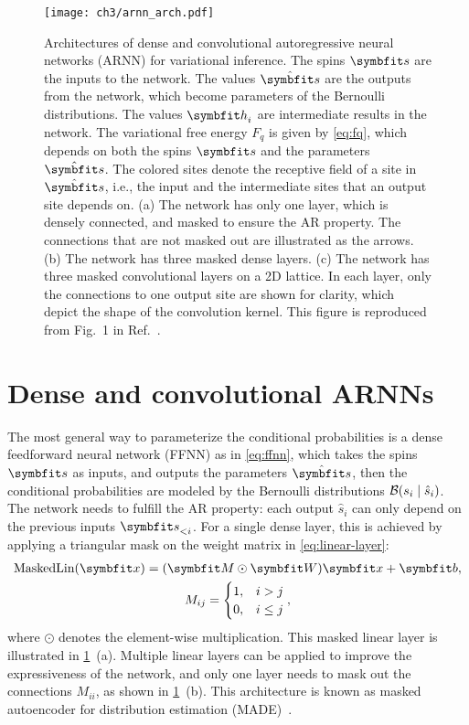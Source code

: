 \begin{figure}[htb]
\centering
\texttt{[image: ch3/arnn\_arch.pdf]}
\caption[Architectures of autoregressive neural networks (ARNN)]{
Architectures of dense and convolutional autoregressive neural networks (ARNN) for variational inference.
The spins $\vs$ are the inputs to the network.
The values $\hat{\vs}$ are the outputs from the network, which become parameters of the Bernoulli distributions.
The values $\vh_i$ are intermediate results in the network.
The variational free energy $F_q$ is given by \cref{eq:fq}, which depends on both the spins $\vs$ and the parameters $\hat{\vs}$.
The colored sites denote the receptive field of a site in $\hat{\vs}$, i.e., the input and the intermediate sites that an output site depends on.
(a) The network has only one layer, which is densely connected, and masked to ensure the AR property. The connections that are not masked out are illustrated as the arrows.
(b) The network has three masked dense layers.
(c) The network has three masked convolutional layers on a 2D lattice. In each layer, only the connections to one output site are shown for clarity, which depict the shape of the convolution kernel.
This figure is reproduced from Fig.~1 in Ref.~\cite{wu2019solving}.
}
\label{fig:arnn-arch}
\end{figure}

\section{Dense and convolutional ARNNs}

The most general way to parameterize the conditional probabilities is a dense feedforward neural network (FFNN) as in \cref{eq:ffnn}, which takes the spins $\vs$ as inputs, and outputs the parameters $\hat{\vs}$, then the conditional probabilities are modeled by the Bernoulli distributions $\mathcal{B}(s_i \mid \hat{s}_i)$. The network needs to fulfill the AR property: each output $\hat{s}_i$ can only depend on the previous inputs $\vs_{< i}$. For a single dense layer, this is achieved by applying a triangular mask on the weight matrix in \cref{eq:linear-layer}:
\begin{gather}
\text{MaskedLin}(\vx) = (\mM \odot \mW) \vx + \mb, \\
M_{i j} = \begin{cases}
1, & i > j \\
0, & i \le j
\end{cases},
\end{gather}
where $\odot$ denotes the element-wise multiplication. This masked linear layer is illustrated in \cref{fig:arnn-arch}~(a). Multiple linear layers can be applied to improve the expressiveness of the network, and only one layer needs to mask out the connections $M_{i i}$, as shown in \cref{fig:arnn-arch}~(b). This architecture is known as masked autoencoder for distribution estimation (MADE)~\cite{germain2015made}.

